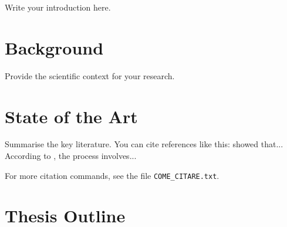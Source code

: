 



Write your introduction here.

\section{Background}

Provide the scientific context for your research.

\section{State of the Art}

Summarise the key literature. You can cite references like this:
\cite{Smith2020} showed that... According to \cite{Brown2018}, the process involves...

For more citation commands, see the file \texttt{COME\_CITARE.txt}.

\section{Thesis Outline}

